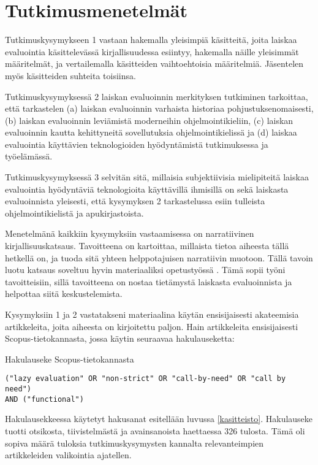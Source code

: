 \section{Tutkimusmenetelmät}\label{metodologia}

Tutkimuskysymykseen 1 vastaan hakemalla yleisimpiä käsitteitä, joita laiskaa evaluointia käsittelevässä kirjallisuudessa esiintyy, hakemalla näille yleisimmät määritelmät, ja vertailemalla käsitteiden vaihtoehtoisia määritelmiä. Jäsentelen myös käsitteiden suhteita toisiinsa.

Tutkimuskysymyksessä 2 laiskan evaluoinnin merkityksen tutkiminen tarkoittaa, että tarkastelen (a) laiskan evaluoinnin varhaista historiaa pohjustuksenomaisesti, (b) laiskan evaluoinnin leviämistä moderneihin ohjelmointikieliin, (c) laiskan evaluoinnin kautta kehittyneitä sovellutuksia ohjelmointikielissä ja (d) laiskaa evaluointia käyttävien teknologioiden hyödyntämistä tutkimuksessa ja työelämässä.

Tutkimuskysymyksessä 3 selvitän sitä, millaisia subjektiivisia mielipiteitä laiskaa evaluointia hyödyntäviä teknologioita käyttävillä ihmisillä on sekä laiskasta evaluoinnista yleisesti, että kysymyksen 2 tarkastelussa esiin tulleista ohjelmointikielistä ja apukirjastoista.

Menetelmänä kaikkiin kysymyksiin vastaamisessa on narratiivinen kirjallisuuskatsaus. Tavoitteena on kartoittaa, millaista tietoa aiheesta tällä hetkellä on, ja tuoda sitä yhteen helppotajuisen narratiivin muotoon. Tällä tavoin luotu katsaus soveltuu hyvin materiaaliksi opetustyössä \citep[s. 312]{baumeister1997writing}. Tämä sopii työni tavoitteisiin, sillä tavoitteena on nostaa tietämystä laiskasta evaluoinnista ja helpottaa siitä keskustelemista.

Kysymyksiin 1 ja 2 vastatakseni materiaalina käytän ensisijaisesti akateemisia artikkeleita, joita aiheesta on kirjoitettu paljon. Hain artikkeleita ensisijaisesti Scopus-tietokannasta, jossa käytin seuraavaa hakulauseketta:

\begin{listing}[H]
  \caption{Hakulauseke Scopus-tietokannasta}
  \bigskip
  \begin{verbatim}
("lazy evaluation" OR "non-strict" OR "call-by-need" OR "call by need")
AND ("functional")
  \end{verbatim}
\end{listing}

Hakulausekkeessa käytetyt hakusanat esitellään luvussa \ref{kasitteisto}. Hakulauseke tuotti otsikosta, tiivistelmästä ja avainsanoista haettaessa 326 tulosta. Tämä oli sopiva määrä tuloksia tutkimuskysymysten kannalta relevanteimpien artikkeleiden valikointia ajatellen.

